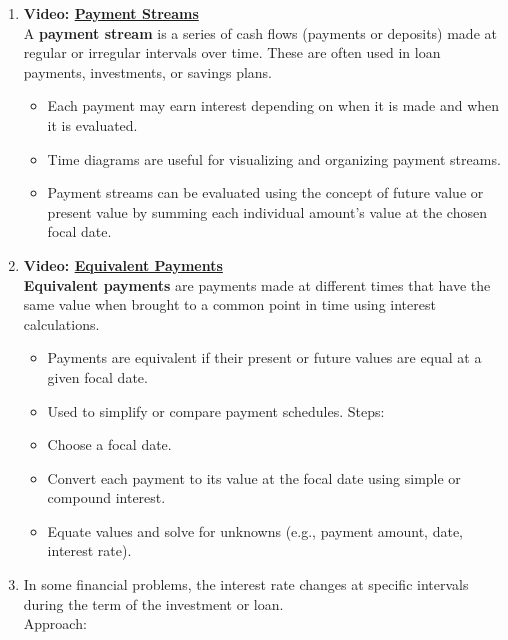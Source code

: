 \documentclass[
]{book}
\providecommand{\tightlist}{%
  \setlength{\itemsep}{0pt}\setlength{\parskip}{0pt}}
\begin{document}
\begin{enumerate}
\def\labelenumi{\arabic{enumi}.}
\tightlist
\item
  \textbf{Video: \href{https://youtu.be/HLUDkVUHNwM}{Payment Streams}}\\
  A \textbf{payment stream} is a series of cash flows (payments or deposits) made at regular or irregular intervals over time. These are often used in loan payments, investments, or savings plans.

  \begin{itemize}
  \tightlist
  \item
    Each payment may earn interest depending on when it is made and when it is evaluated.
  \item
    Time diagrams are useful for visualizing and organizing payment streams.
  \item
    Payment streams can be evaluated using the concept of future value or present value by summing each individual amount's value at the chosen focal date.
  \end{itemize}
\item
  \textbf{Video: \href{https://youtu.be/HLUDkVUHNwM}{Equivalent Payments}}\\
  \textbf{Equivalent payments} are payments made at different times that have the same value when brought to a common point in time using interest calculations.

  \begin{itemize}
  \tightlist
  \item
    Payments are equivalent if their present or future values are equal at a given focal date.
  \item
    Used to simplify or compare payment schedules.
    Steps:
  \item
    Choose a focal date.
  \item
    Convert each payment to its value at the focal date using simple or compound interest.
  \item
    Equate values and solve for unknowns (e.g., payment amount, date, interest rate).
  \end{itemize}
\item
  In some financial problems, the interest rate changes at specific intervals during the term of the investment or loan.\\
  Approach:


\end{enumerate}
\end{document}
